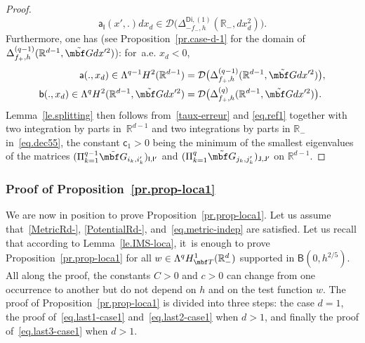 \begin{proof}
\[
\mathsf a_{\mathsf I}(x',.) dx_d \in \mathcal D\bigl(\Delta_{-f_-,h}^{\mathsf{Di},(1)}(\mathbb R_-, dx_d^2) \bigr).
\]
Furthermore, one has (see Proposition~\ref{pr.case-d-1} for the
domain of $ \Delta_{f_+,h}^{(q-1)}(\mathbb R^{d-1}, \tilde{\mbf G}dx'^2)$): for~a.e. $x_d< 0$,
\begin{align*}
\mathsf a(.,x_d) \in \Lambda^{q-1}H^2 (\mathbb R^{d-1}) &= \mathcal D\bigl(\Delta_{f_+,h}^{(q-1)}(\mathbb R^{d-1}, \tilde{\mbf G}dx'^2)\bigr),
\\
\mathsf b(.,x_d) \in \Lambda^{q}H^2 (\mathbb R^{d-1}, \tilde{\mbf G}dx'^2)&= \mathcal D\bigl(\Delta_{f_+,h}^{(q)}(\mathbb R^{d-1}, \tilde{\mbf G}dx'^2)\bigr).
\end{align*}
Lemma~\ref{le.splitting} then follows from~\eqref{taux-erreur} and \eqref{eq.ref1} together with two integration by parts in~$\mathbb R^{d-1}$ and two integrations by parts in $\mathbb R_-$ in~\eqref{eq.dec55}, the constant $\mathsf c_1 >0$ being the minimum of the smallest eigenvalues of the matrices $(\Pi_{k=1}^{q-1} \tilde{\mbf G}_{i_k,i_k'})_{\mathsf I,\mathsf I'}$ and $ (\Pi_{k=1}^{q} \tilde{\mbf G}_{j_k,j_k'})_{\mathsf J,\mathsf J'}$ on $\mathbb R^{d-1}$.
\end{proof}

\subsubsection{Proof of Proposition~\ref{pr.prop-loca1}}\label{sec:prop-loca1-proof}
We are now in position to prove Proposition~\ref{pr.prop-loca1}.
Let us assume that~\ref{MetricRd-}, \ref{PotentialRd-}, and~\eqref{eq.metric-indep} are satisfied. Let us recall that according to Lemma~\ref{le.IMS-loca}, it~is enough to prove Proposition~\ref{pr.prop-loca1} for all
$w\in \Lambda^q H^1_{\mbf T}(\mathbb R^d_-)$ supported in $\mathsf B(0,h^{2/5 })$. All along the proof, the constants $C>0$ and $c>0$ can change from one occurrence to another but do not depend on $h$ and on the test function $w$.
The proof of Proposition~\ref{pr.prop-loca1} is divided into three
steps: the case $d=1$, the proof of~\eqref{eq.last1-case1}
and~\eqref{eq.last2-case1} when $d>1$, and finally the proof of~\eqref{eq.last3-case1} when $d>1$.

